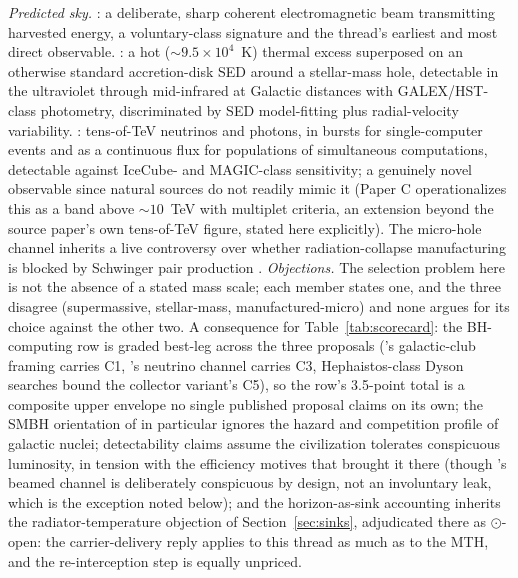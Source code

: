 \documentclass[11pt]{article}
\newcommand{\shalf}{\ensuremath{\odot}} %
\begin{document}
\emph{Predicted sky.} \citet{Inoue2011}: a deliberate, sharp coherent electromagnetic beam transmitting harvested energy, a voluntary-class signature and the thread's earliest and most direct observable. \citet{Hsiao2021}: a hot ($\sim9.5\times10^{4}$~K) thermal excess superposed on an otherwise standard accretion-disk SED around a stellar-mass hole, detectable in the ultraviolet through mid-infrared at Galactic distances with GALEX/HST-class photometry, discriminated by SED model-fitting plus radial-velocity variability. \citet{Dvali2023}: tens-of-TeV neutrinos and photons, in bursts for single-computer events and as a continuous flux for populations of simultaneous computations, detectable against IceCube- and MAGIC-class sensitivity; a genuinely novel observable since natural sources do not readily mimic it (Paper C operationalizes this as a band above $\sim 10$~TeV with multiplet criteria, an extension beyond the source paper's own tens-of-TeV figure, stated here explicitly). The micro-hole channel inherits a live controversy over whether radiation-collapse manufacturing is blocked by Schwinger pair production \citep{AlvarezDominguez2024,Loeb2024Comment}.
\emph{Objections.} The selection problem here is not the absence of a stated mass scale; each member states one, and the three disagree (supermassive, stellar-mass, manufactured-micro) and none argues for its choice against the other two. A consequence for Table~\ref{tab:scorecard}: the BH-computing row is graded best-leg across the three proposals (\citealt{Inoue2011}'s galactic-club framing carries C1, \citealt{Dvali2023}'s neutrino channel carries C3, Hephaistos-class Dyson searches bound the collector variant's C5), so the row's 3.5-point total is a composite upper envelope no single published proposal claims on its own; the SMBH orientation of \citet{Inoue2011} in particular ignores the hazard and competition profile of galactic nuclei; detectability claims assume the civilization tolerates conspicuous luminosity, in tension with the efficiency motives that brought it there (though \citet{Inoue2011}'s beamed channel is deliberately conspicuous by design, not an involuntary leak, which is the exception noted below); and the horizon-as-sink accounting inherits the radiator-temperature objection of Section~\ref{sec:sinks}, adjudicated there as \shalf-open: the carrier-delivery reply applies to this thread as much as to the MTH, and the re-interception step is equally unpriced.
\end{document}
